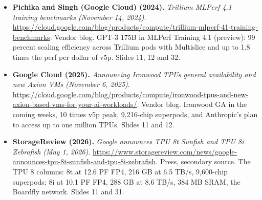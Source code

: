 \begin{itemize}[leftmargin=1.2em,itemsep=3pt]
\item \textbf{Pichika and Singh (Google Cloud) (2024).} \textit{Trillium MLPerf 4.1 training benchmarks (November 14, 2024)}. \url{https://cloud.google.com/blog/products/compute/trillium-mlperf-41-training-benchmarks}. Vendor blog. GPT-3 175B in MLPerf Training 4.1 (preview): 99 percent scaling efficiency across Trillium pods with Multislice and up to 1.8 times the perf per dollar of v5p. Slides 11, 12 and 32.
\item \textbf{Google Cloud (2025).} \textit{Announcing Ironwood TPUs general availability and new Axion VMs (November 6, 2025)}. \url{https://cloud.google.com/blog/products/compute/ironwood-tpus-and-new-axion-based-vms-for-your-ai-workloads/}. Vendor blog. Ironwood GA in the coming weeks, 10 times v5p peak, 9,216-chip superpods, and Anthropic's plan to access up to one million TPUs. Slides 11 and 12.
\item \textbf{StorageReview (2026).} \textit{Google announces TPU 8t Sunfish and TPU 8i Zebrafish (May 1, 2026)}. \url{https://www.storagereview.com/news/google-announces-tpu-8t-sunfish-and-tpu-8i-zebrafish}. Press, secondary source. The TPU 8 columns: 8t at 12.6 PF FP4, 216 GB at 6.5 TB/s, 9,600-chip superpods; 8i at 10.1 PF FP4, 288 GB at 8.6 TB/s, 384 MB SRAM, the Boardfly network. Slides 11 and 31.
\end{itemize}
